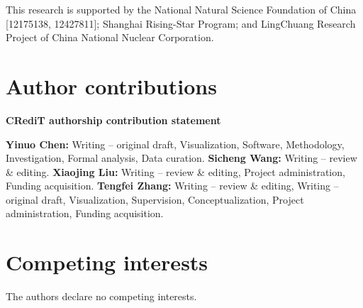 \documentclass[11pt,a4paper]{article}
\begin{document}
This research is supported by the National Natural Science Foundation
of China [12175138, 12427811]; Shanghai Rising-Star Program; and
LingChuang Research Project of China National Nuclear Corporation.

\section*{Author contributions}

\textbf{CRediT authorship contribution statement}

\textbf{Yinuo Chen:} Writing -- original draft, Visualization, Software,
Methodology, Investigation, Formal analysis, Data curation.
\textbf{Sicheng Wang:} Writing -- review \& editing.
\textbf{Xiaojing Liu:} Writing -- review \& editing, Project
administration, Funding acquisition.
\textbf{Tengfei Zhang:} Writing -- review \& editing, Writing -- original
draft, Visualization, Supervision, Conceptualization, Project
administration, Funding acquisition.

\section*{Competing interests}

The authors declare no competing interests.
\end{document}
